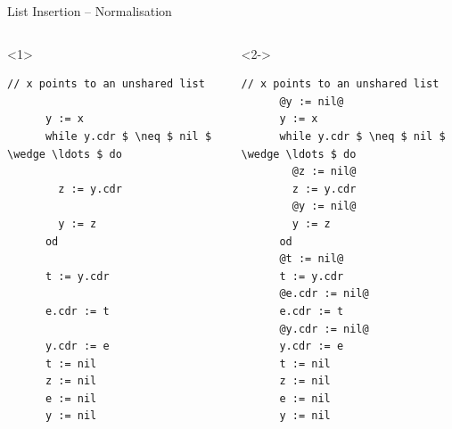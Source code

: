 \documentclass[xcolor={usenames,dvipsnames}]{beamer}
\begin{document}
\begin{frame}[fragile]{List Insertion -- Normalisation}
  \begin{columns}[T]
	  \begin{onlyenv}
	  \begin{lstlisting}[mathescape]
	  // x points to an unshared list
	  
	  y := x
	  while y.cdr $ \neq $ nil $ \wedge \ldots $ do

	    z := y.cdr

	    y := z
	  od

	  t := y.cdr

	  e.cdr := t

	  y.cdr := e
	  t := nil
	  z := nil
	  e := nil
	  y := nil
	  \end{lstlisting}
	  \end{onlyenv}
	  \begin{onlyenv}<2->
	  \begin{lstlisting}[mathescape]
	  // x points to an unshared list
	  @y := nil@
	  y := x
	  while y.cdr $ \neq $ nil $ \wedge \ldots $ do
	    @z := nil@
	    z := y.cdr
	    @y := nil@
	    y := z
	  od
	  @t := nil@
	  t := y.cdr
	  @e.cdr := nil@
	  e.cdr := t
	  @y.cdr := nil@
	  y.cdr := e
	  t := nil
	  z := nil
	  e := nil
	  y := nil
	  \end{lstlisting}
    \end{onlyenv}
        \pause\pause
        \begin{tikzpicture}[ampersand replacement=\&, >=latex,
          level 2/.style={onslide=<-3>{transparent}}]
        

\end{tikzpicture}
\end{columns}
\end{frame}
\end{document}
